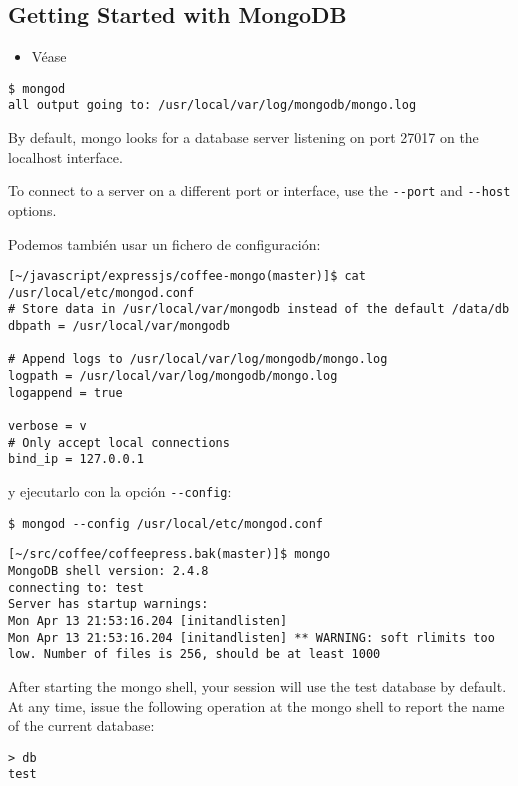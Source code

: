 \subsection{Getting Started with MongoDB}

\begin{itemize}
\item
Véase
\end{itemize}
\begin{verbatim}
$ mongod
all output going to: /usr/local/var/log/mongodb/mongo.log
\end{verbatim}

By default, mongo looks for a database server listening on port 27017
on the localhost interface. 

To connect to a server on a different port
or interface, use the \verb|--port| and
\verb|--host| options.

Podemos también usar un fichero de configuración:
\begin{verbatim}
[~/javascript/expressjs/coffee-mongo(master)]$ cat /usr/local/etc/mongod.conf
# Store data in /usr/local/var/mongodb instead of the default /data/db
dbpath = /usr/local/var/mongodb

# Append logs to /usr/local/var/log/mongodb/mongo.log
logpath = /usr/local/var/log/mongodb/mongo.log
logappend = true

verbose = v 
# Only accept local connections
bind_ip = 127.0.0.1
\end{verbatim}

y ejecutarlo con la opción \verb|--config|:
\begin{verbatim}
$ mongod --config /usr/local/etc/mongod.conf
\end{verbatim}

\begin{verbatim}
[~/src/coffee/coffeepress.bak(master)]$ mongo
MongoDB shell version: 2.4.8
connecting to: test
Server has startup warnings: 
Mon Apr 13 21:53:16.204 [initandlisten] 
Mon Apr 13 21:53:16.204 [initandlisten] ** WARNING: soft rlimits too low. Number of files is 256, should be at least 1000
\end{verbatim}

After starting the mongo shell, your session will use the test database by default. At any time, issue the following operation at the mongo shell to report the name of the current database:
\begin{verbatim}
> db
test
\end{verbatim}

